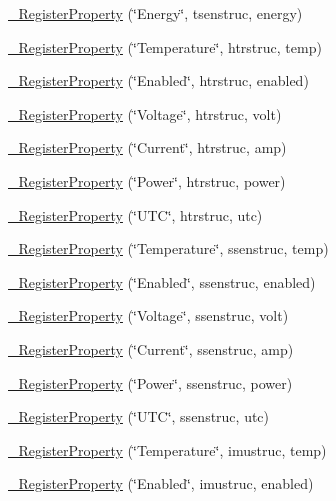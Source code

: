 \begin{DoxyCompactItemize}
\hyperlink{namespacecubesat_a780e0c325fea4d8107d452415b2bd827}{\+\_\+\+Register\+Property} (\char`\"{}Energy\char`\"{}, tsenstruc, energy)
\item 
\hyperlink{namespacecubesat_a8021a4361004392205cf0b556908b6ab}{\+\_\+\+Register\+Property} (\char`\"{}Temperature\char`\"{}, htrstruc, temp)
\item 
\hyperlink{namespacecubesat_ae7e5037a9e3fe065fbf9be12b5e89606}{\+\_\+\+Register\+Property} (\char`\"{}Enabled\char`\"{}, htrstruc, enabled)
\item 
\hyperlink{namespacecubesat_ad93c2f1b2cbf600039df86ec7217fd2c}{\+\_\+\+Register\+Property} (\char`\"{}Voltage\char`\"{}, htrstruc, volt)
\item 
\hyperlink{namespacecubesat_a61bd28e07b0eabac7cb4c12bd3ee1927}{\+\_\+\+Register\+Property} (\char`\"{}Current\char`\"{}, htrstruc, amp)
\item 
\hyperlink{namespacecubesat_a84d24bce3fabb54c8b9264517d787e3d}{\+\_\+\+Register\+Property} (\char`\"{}Power\char`\"{}, htrstruc, power)
\item 
\hyperlink{namespacecubesat_af3c7174c92afdb054b1946516d8d2fd3}{\+\_\+\+Register\+Property} (\char`\"{}U\+TC\char`\"{}, htrstruc, utc)
\item 
\hyperlink{namespacecubesat_a8da88e33bf3374e90d99c3f3fc05d269}{\+\_\+\+Register\+Property} (\char`\"{}Temperature\char`\"{}, ssenstruc, temp)
\item 
\hyperlink{namespacecubesat_a894241cbe0e2afc9b2e2f018fc9b4f42}{\+\_\+\+Register\+Property} (\char`\"{}Enabled\char`\"{}, ssenstruc, enabled)
\item 
\hyperlink{namespacecubesat_a8ff8499c07abacbe97d6c1693730f360}{\+\_\+\+Register\+Property} (\char`\"{}Voltage\char`\"{}, ssenstruc, volt)
\item 
\hyperlink{namespacecubesat_adfac989178e975bc1fb191b2a568debd}{\+\_\+\+Register\+Property} (\char`\"{}Current\char`\"{}, ssenstruc, amp)
\item 
\hyperlink{namespacecubesat_aaef1a8d0e7ab780c34e00629ca20472d}{\+\_\+\+Register\+Property} (\char`\"{}Power\char`\"{}, ssenstruc, power)
\item 
\hyperlink{namespacecubesat_aef4b72fea119a05fe8ea09fdb8f1e9b2}{\+\_\+\+Register\+Property} (\char`\"{}U\+TC\char`\"{}, ssenstruc, utc)
\item 
\hyperlink{namespacecubesat_a67d2242ce2f4ec114b11c03d2d94e1f3}{\+\_\+\+Register\+Property} (\char`\"{}Temperature\char`\"{}, imustruc, temp)
\item 
\hyperlink{namespacecubesat_ac77186cd76d188df01efaf49de9c81ca}{\+\_\+\+Register\+Property} (\char`\"{}Enabled\char`\"{}, imustruc, enabled)

\end{DoxyCompactItemize}
